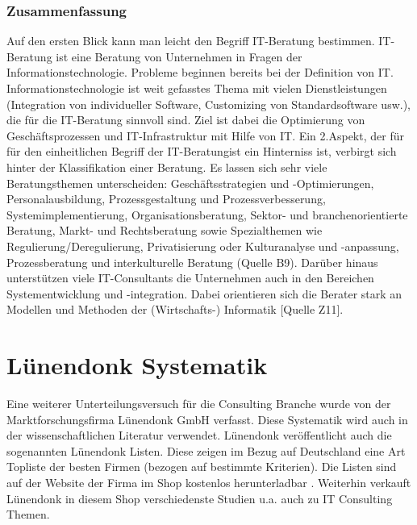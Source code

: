 		\subsubsection{Zusammenfassung}
			
			
			Auf den ersten Blick kann man leicht den Begriff IT-Beratung bestimmen. IT-Beratung ist eine Beratung von Unternehmen in Fragen der Informationstechnologie. Probleme beginnen bereits bei der Definition von IT. Informationstechnologie ist weit gefasstes Thema mit vielen Dienstleistungen (Integration von individueller Software, Customizing von Standardsoftware usw.), die für die IT-Beratung sinnvoll sind. Ziel ist dabei die Optimierung von Geschäftsprozessen und IT-Infrastruktur mit Hilfe von IT.
			Ein 2.Aspekt, der für für den einheitlichen Begriff der IT-Beratungist ein Hinterniss ist, verbirgt sich hinter der Klassifikation einer Beratung. Es lassen sich sehr viele Beratungsthemen unterscheiden: Geschäftsstrategien und -Optimierungen, Personalausbildung, Prozessgestaltung und Prozessverbesserung, Systemimplementierung, Organisationsberatung, Sektor- und branchenorientierte Beratung, Markt- und Rechtsberatung sowie Spezialthemen wie
			Regulierung/Deregulierung,  Privatisierung oder Kulturanalyse und -anpassung, Prozessberatung und  interkulturelle Beratung (Quelle B9).
			Darüber hinaus unterstützen viele IT-Consultants die Unternehmen auch in den Bereichen Systementwicklung und -integration. Dabei orientieren sich die Berater stark an Modellen und Methoden der (Wirtschafts-) Informatik [Quelle Z11].
			

\section{Lünendonk Systematik}
Eine weiterer Unterteilungsversuch für die Consulting Branche wurde von der Marktforschungsfirma Lünendonk GmbH verfasst.
Diese Systematik wird auch in der wissenschaftlichen Literatur \cite[56]{Lippold201309} verwendet. Lünendonk veröffentlicht
auch die sogenannten Lünendonk Listen. Diese zeigen im Bezug auf Deutschland eine Art Topliste der besten Firmen (bezogen auf bestimmte Kriterien).
Die Listen sind auf der Website der Firma im Shop kostenlos herunterladbar \cite {topBITP} . Weiterhin verkauft Lünendonk in diesem Shop verschiedenste Studien u.a.
auch zu IT Consulting Themen.

